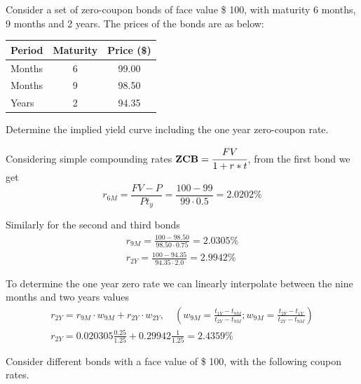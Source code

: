 \documentclass[12pt,a4paper]{exam}
\begin{document}
\begin{questions}
  \question
  Consider a set of zero-coupon bonds of face value \$ 100, with maturity 6 months, 9 months and 2 years. The prices of the bonds are as below:
\begin{table}[h]
  \begin{center}
    \begin{tabular}{|l|c|c|}
      \hline
      \textbf{Period} & \textbf{Maturity} & \textbf{Price (\$)} \\ \hline
      Months          & 6                 & 99.00               \\ \hline
      Months          & 9                 & 98.50               \\ \hline
      Years           & 2                 & 94.35               \\ \hline
    \end{tabular}
  \end{center}
\end{table}
Determine the implied yield curve including the one year zero-coupon rate.
\fillwithlines{3cm}
\begin{solution}
Considering simple compounding rates $\textbf{ZCB}=\cfrac{FV}{1+r*t}$, from the first bond we get
\begin{equation*}
  r_{6M} = \frac{FV-P}{Pt_y} = \frac{100 - 99}{99\cdot0.5} = 2.0202\% 
\end{equation*}

Similarly for the second and third bonds
\begin{equation*}
  \begin{gathered}
    r_{9M} = \frac{100 - 98.50}{98.50\cdot0.75} = 2.0305\% \\
    r_{2Y} = \frac{100 - 94.35}{94.35\cdot2.0} = 2.9942\%
 \end{gathered}   
\end{equation*}

To determine the one year zero rate we can linearly interpolate between the nine months and two years values
\begin{equation*}
  \begin{gathered}
    r_{2Y} = r_{9M}\cdot w_{9M} + r_{2Y}\cdot w_{2Y},\quad\left(w_{9M}=\frac{t_{1Y}-t_{9M}}{t_{2Y}-t_{9M}};w_{9M}=\frac{t_{2Y}-t_{1Y}}{t_{2Y}-t_{9M}}\right) \\
    r_{2Y} = 0.020305\frac{0.25}{1.25} + 0.29942 \frac{1}{1.25} = 2.4359\%
  \end{gathered}
\end{equation*}
\end{solution}
\question
Consider different bonds with a face value of \$ 100, with the following coupon rates.


\end{questions}
\end{document}
